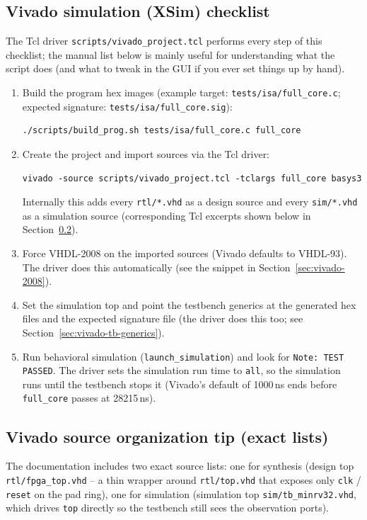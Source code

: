 \subsection{Vivado simulation (XSim) checklist}
The Tcl driver \texttt{scripts/vivado\_project.tcl} performs every step of
this checklist; the manual list below is mainly useful for understanding what
the script does (and what to tweak in the GUI if you ever set things up by
hand).
\begin{enumerate}[leftmargin=*]
  \item Build the program hex images (example target: \texttt{tests/isa/full\_core.c}; expected signature: \texttt{tests/isa/full\_core.sig}):
\begin{lstlisting}[style=minrv]
./scripts/build_prog.sh tests/isa/full_core.c full_core
\end{lstlisting}
  \item Create the project and import sources via the Tcl driver:
\begin{lstlisting}[style=minrv]
vivado -source scripts/vivado_project.tcl -tclargs full_core basys3
\end{lstlisting}
  Internally this adds every \texttt{rtl/*.vhd} as a design source and every
  \texttt{sim/*.vhd} as a simulation source (corresponding Tcl excerpts shown
  below in Section~\ref{sec:vivado-sources}).
  \item Force VHDL-2008 on the imported sources (Vivado defaults to VHDL-93). The driver does this automatically (see the snippet in Section~\ref{sec:vivado-2008}).
  \item Set the simulation top and point the testbench generics at the generated hex files and the expected signature file (the driver does this too; see Section~\ref{sec:vivado-tb-generics}).
  \item Run behavioral simulation (\texttt{launch\_simulation}) and look for \texttt{Note: TEST PASSED}. The driver sets the simulation run time to \texttt{all}, so the simulation runs until the testbench stops it (Vivado's default of 1000\,ns ends before \texttt{full\_core} passes at 28215\,ns).
\end{enumerate}

\subsection{Vivado source organization tip (exact lists)}
\label{sec:vivado-sources}
The documentation includes two exact source lists: one for synthesis (design
top \texttt{rtl/fpga\_top.vhd} -- a thin wrapper around \texttt{rtl/top.vhd}
that exposes only \texttt{clk} / \texttt{reset} on the pad ring), one for
simulation (simulation top \texttt{sim/tb\_minrv32.vhd}, which drives
\texttt{top} directly so the testbench still sees the observation ports).


